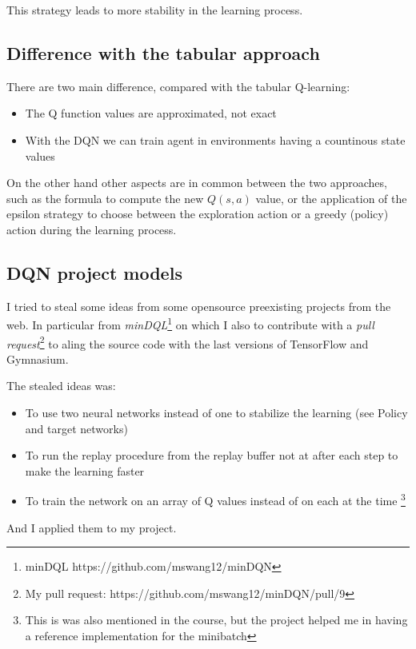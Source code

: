 \documentclass{article}
\begin{document}
This strategy leads to more stability in the learning process.

\subsection{Difference with the tabular approach}

There are two main difference, compared with the tabular Q-learning:

\begin{itemize}
  \item{The Q function values are approximated, not exact}
  \item{With the DQN we can train agent in environments having a countinous state values}
\end{itemize}

On the other hand other aspects are in common between the two approaches, such as
the formula to compute the new $Q(s,a)$ value, or the application of the epsilon strategy
to choose between the exploration action or a greedy (policy) action during the learning process.

\subsection{DQN project models}

I tried to steal some ideas from some opensource preexisting projects from the web.
In particular from \emph{minDQL}\footnote{minDQL https://github.com/mswang12/minDQN} on which I also to contribute with 
a \emph{pull request}\footnote{My pull request: https://github.com/mswang12/minDQN/pull/9} 
to aling the source code with the last versions of TensorFlow and Gymnasium.

The stealed ideas was:

\begin{itemize}
  \item{To use two neural networks instead of one to stabilize the learning (see Policy and target networks)}
  \item{To run the replay procedure from the replay buffer not at after each step to make the learning faster}
  \item{To train the network on an array of Q values instead of on each at the time
  \footnote{This is was also mentioned in the course, but the project helped me in having a reference implementation for the minibatch}}
\end{itemize}

And I applied them to my project.
\end{document}
